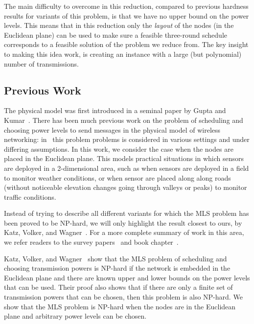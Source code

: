 \documentclass{article}
\begin{document}
The main difficulty to overcome in this reduction, compared to previous hardness results for variants of this problem, is that we have no upper bound on the power levels. This means that in this reduction only the {\em layout} of the nodes (in the Euclidean plane) can be used to make sure a feasible three-round schedule corresponds to a feasible solution of the problem we reduce from.  The key insight to making this idea work, is creating an instance with a large (but polynomial) number of transmissions.

\subsection{Previous Work}
\label{sec:pw}
The physical model was first introduced in a seminal paper by Gupta and Kumar~\cite{GuptaKumar1999}.
There has been much previous work on the problem of scheduling and choosing power levels to send messages in the physical model of wireless networking: in~\cite{GOW07,AD09,KVW10,FKRV09,T09} this problem problems is considered in various settings and under differing assumptions.
In this work, we consider the case when the nodes are placed in the Euclidean plane. This models practical situations in which sensors are deployed in a 2-dimensional area, such as when sensors are deployed in a field to monitor weather conditions, or when sensor are placed along along roads  (without noticeable elevation changes going through valleys or peaks) to monitor traffic conditions.




Instead of trying to describe all different variants for which the MLS problem has been proved to be NP-hard, we will only highlight the result closest to ours, by
Katz, Volker, and Wagner~\cite{KVW10}. For a more complete summary of work in this area, we refer readers to the survey papers~\cite{LRW08,HL09,LP10} and book chapter~\cite{CF09}.

Katz, Volker, and Wagner~\cite{KVW10} show that the MLS problem of scheduling and choosing transmission powers is NP-hard if the network is embedded in the Euclidean plane and there are known upper and lower bounds on the power levels that can be used.  Their proof also shows that if there are only a finite set of transmission powers that can be chosen, then this problem is also NP-hard.  We show that the MLS problem is NP-hard when the nodes are in the Euclidean plane and arbitrary power levels can be chosen.
\end{document}
